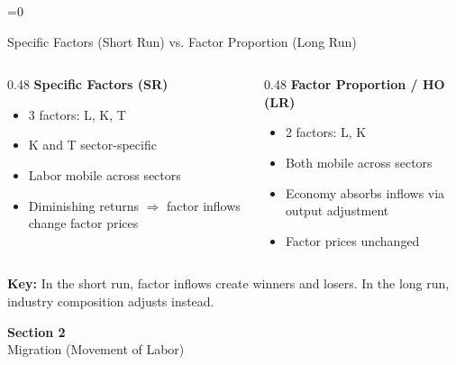 \documentclass{beamer}
\newcommand{\showanswers}{1}  %
\begin{document}

\ifnum\showanswers=0

\begin{frame}{Specific Factors (Short Run) vs. Factor Proportion (Long Run)}

\begin{columns}[T]
\begin{column}{0.48\textwidth}
\textbf{Specific Factors (SR)}
\begin{itemize}
    \item 3 factors: L, K, T
    \item K and T sector-specific
    \item Labor mobile across sectors
    \item Diminishing returns $\Rightarrow$ factor inflows change factor prices
\end{itemize}
\end{column}

\begin{column}{0.48\textwidth}
\textbf{Factor Proportion / HO (LR)}
\begin{itemize}
    \item 2 factors: L, K
    \item Both mobile across sectors
    \item Economy absorbs inflows via output adjustment
    \item Factor prices unchanged
\end{itemize}
\end{column}
\end{columns}

\vspace{0.5cm}

\textbf{Key:} In the short run, factor inflows create winners and losers. In the long run, industry composition adjusts instead.

\end{frame}

\fi


\begin{frame}

\vspace{2cm}

\centering
{\LARGE \textbf{Section 2}} \\[0.5cm]
{\Large Migration (Movement of Labor)}

\vfill

\end{frame}
\end{document}
